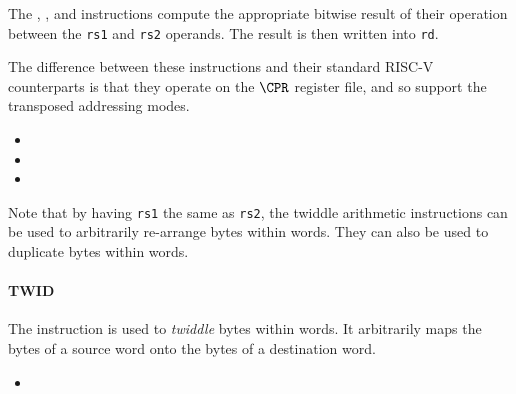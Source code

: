 The , , and  instructions compute the
appropriate bitwise result of their operation between the {\tt rs1} and
{\tt rs2} operands. The result is then written into {\tt rd}.

The difference between these instructions and their standard RISC-V
counterparts is that they operate on the $\CPR$ register file, and so
support the transposed addressing modes.

\begin{itemize}
\item {}
\item {}
\item {}
\end{itemize}

Note that by having {\tt rs1} the same as {\tt rs2}, the twiddle
arithmetic instructions can be used to arbitrarily re-arrange bytes
within words. They can also be used to duplicate bytes within words.

\paragraph{TWID}

The  instruction is used to {\em twiddle} bytes within words.
It arbitrarily maps the bytes of a source word onto the bytes of a
destination word.

\begin{itemize}
\item {}
\end{itemize}


